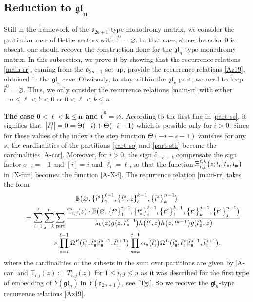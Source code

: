 \documentclass[10pt,a4paper]{amsart}
\newcommand{\so}{\scriptscriptstyle \rm I}
\newcommand{\st}{\scriptscriptstyle \rm I\hspace{-1pt}I}
\newcommand{\sth}{\scriptscriptstyle \rm I\hspace{-1pt}I\hspace{-1pt}I}
\newcommand{\bt}{{\bar t}}
\theoremstyle{definition}
\def\BB{{\mathbb{B}}}
\def\TT{{\mathbb{T}}}
\def\r#1{\eqref{#1}}
\def\Oml{\Omega^L}
\def\Omr{\Omega^R}
\begin{document}
\subsection[Reduction to gl\_n]{Reduction to $\boldsymbol{\mathfrak{gl}_n}$}\label{sect:red-gln}
Still in the framework of the $\mathfrak{o}_{2n+1}$-type monodromy matrix,
we consider the particular case of Bethe vectors with $\bt^0=\varnothing$. In that case,
since the color 0 is absent, one should recover the construction done for the
$\mathfrak{gl}_{n}$-type monodromy matrix. In this subsection, we prove it by showing that the recurrence relations
\r{main-rr}, coming from the $\mathfrak{o}_{2n+1}$ set-up, provide the recurrence relations \eqref{Az19},
obtained in the
$\mathfrak{gl}_{n}$ case. Obviously, to stay within the $\mathfrak{gl}_{n}$ part, we need to keep
$\bt^0=\varnothing$. Thus, we only consider the recurrence relations
\r{main-rr} with either $-n\leq \ell< k<0$ or $0<\ell< k\leq n$.


{\bf The case $\boldsymbol{0<\ell<k\leq n}$ and $\boldsymbol{\bt^0=\varnothing}$.} According to the first line in
\r{part-so}, it signifies that~${\big|\bt^0_{\so}\big|=0=\Theta(-i)+\Theta(-i-1)}$
which is possible only for $i>0$. Since for these values of the index $i$
the step function
$\Theta(-i-s-1)$ vanishes for any $s$, the cardinalities of the partitions
\r{part-so} and \r{part-sth} become the cardinalities \r{A-car}. Moreover, for $i>0$,
 the sign $\delta_{-\ell-k}$ compensate the sign factor
$\sigma_{-i}=-1$ and $[i]=i$ and $\ell_i=\ell$, so that
the function $\Xi^{\ell,k}_{i,j}\bigl(z;\bt_{\so},\bt_{\st},\bt_{\sth}\bigr)$ in \r{X-fun}
becomes the function
\r{A-X-f}.
The recurrence relation \r{main-rr} takes the form
\begin{gather}
\BB\bigl(\varnothing,\bigl\{\bt^s\bigr\}_1^{\ell-1},\bigl\{\bt^{s},z\bigr\}_{\ell}^{k-1},\bigl\{\bt^s\bigr\}_k^{n-1}\bigr)\nonumber\\
\qquad=\sum_{i=1}^{\ell}\sum_{j=k}^n \sum_{\rm part}
\frac{\TT_{i,j}(z)\cdot\BB\bigl(\varnothing,\bigl\{\bt^s\bigr\}_{1}^{i-1},\bigl\{\bt^s_{\st}\bigr\}_{i}^{\ell-1},
\bigl\{\bt^s\bigr\}_{\ell}^{k-1},\bigl\{\bt^s_{\st}\bigr\}_{k}^{j-1},\bigl\{\bt^s\bigr\}_{j}^{n-1}\bigr)}
{\lambda_k(z) g\bigl(z,\bt^{\ell-1}_{\st}\bigr) h\bigl(\bt^{\ell},z\bigr) h\bigl(z,\bt^{k-1}\bigr)
g\bigl(\bt^k_{\st},z\bigr)}\nonumber\\
\phantom{\qquad=}{}\times
\prod_{s=i}^{\ell-1}\Omr\bigl(\bt^s_{\so},\bt^s_{\st}|\bt^{s-1}_{\st},\bt^{s+1}_{\st}\bigr)
\prod_{s=k}^{j-1}\alpha_s\bigl(\bt^s_{\so}\bigr)
\Oml\bigl(\bt^s_{\st},\bt^s_{\so}|\bt^{s-1}_{\st},\bt^{s+1}_{\st}\bigr) ,\label{gl-red1}
\end{gather}
where the cardinalities of the subsets in the sum over partitions
are given by \r{A-car} and $\TT_{i,j}(z):= T_{i,j}(z)$ for
$1\leq i,j\leq n$ as it was described for the first type of
embedding of $Y(\mathfrak{gl}_n)$ in $Y(\mathfrak{o}_{2n+1})$, see~\r{Tgl}. So we recover the
$\mathfrak{gl}_n$-type recurrence relations \r{Az19}.
\end{document}
